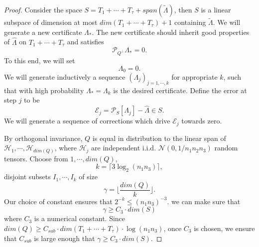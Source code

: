 \documentclass[journal,transmag]{IEEEtran}
\theoremstyle{plain}
\begin{document}
\begin{proof}
Consider the space $S = T_1 + \cdots + T_{\tau}+span(\tilde{\Lambda})$, then $S$ is a linear subspace of dimension at most $dim(T_1+\cdots+T_{\tau})+1$ containing $\tilde{\Lambda}$. We will generate a new certificate $\Lambda_{*}$. The new certificate should inherit good properties of $\hat{\Lambda}$ on $T_1+\cdots+T_{\tau}$ and satisfies
\begin{equation}
\mathcal{P}_{Q^{\bot}}\Lambda_{*}=0.
\end{equation}
To this end, we will set
\begin{equation}
\Lambda_0 = 0.
\end{equation}
We will generate inductively a sequence $(\Lambda_j)_{j=1,\cdots,k}$ for appropriate $k$, such that with high probability $\Lambda_{*}=\Lambda_k$ is the desired certificate. Define the error at step $j$ to be
\begin{equation}
\mathcal{E}_j = \mathcal{P}_S [\Lambda_j]-\hat{\Lambda}\in S.
\end{equation}
We will generate a sequence of corrections which drive $\mathcal{E}_j$ towards zero.

By orthogonal invariance, $Q$ is equal in distribution to the linear span of $\mathcal{H}_1,\cdots, \mathcal{H}_{dim(Q)}$, where $\mathcal{H}_j$ are independent i.i.d. $\mathcal{N}(0,1/n_1 n_2 n_3)$ random tensors. Choose from ${1,\cdots,dim(Q)}$,
\begin{equation}
k = \lceil 3 \log_2(n_1 n_3)\rceil,
\end{equation}
disjoint subsets $I_1,\cdots,I_k$ of size
\begin{equation}
\gamma = \lfloor \frac{dim(Q)}{k} \rfloor.
\end{equation}
Our choice of constant ensures that $2^{-k}\le (n_1 n_3)^{-3}.$
we can make sure that
\begin{equation}
\gamma \ge C_3 \cdot dim(S)
\end{equation}
 where $C_3$ is a numerical constant. Since $dim(Q)\ge C_{sub}\cdot dim(T_1 + \cdots + T_{\tau})\cdot \log(n_1 n_3)$, once $C_3$ is chosen, we ensure that $C_{sub}$ is large enough that $\gamma \ge C_3 \cdot dim(S)$.


\end{proof}
\end{document}
